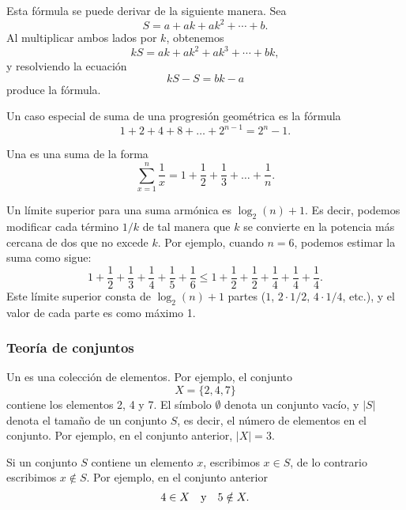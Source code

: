 Esta fórmula se puede derivar de la siguiente manera. Sea
\[ S = a + ak + ak^2 + \cdots + b .\]
Al multiplicar ambos lados por $k$, obtenemos
\[ kS = ak + ak^2 + ak^3 + \cdots + bk,\]
y resolviendo la ecuación
\[ kS-S = bk-a\]
produce la fórmula.

Un caso especial de suma de una progresión geométrica es la fórmula
\[1+2+4+8+\ldots+2^{n-1}=2^n-1.\]


Una  es una suma de la forma
\[ \sum_{x=1}^n \frac{1}{x} = 1+\frac{1}{2}+\frac{1}{3}+\ldots+\frac{1}{n}.\]

Un límite superior para una suma armónica es $\log_2(n)+1$.
Es decir, podemos
modificar cada término $1/k$ de tal manera que $k$ se convierte en
la potencia más cercana de dos que no excede $k$.
Por ejemplo, cuando $n=6$, podemos estimar
la suma como sigue:
\[ 1+\frac{1}{2}+\frac{1}{3}+\frac{1}{4}+\frac{1}{5}+\frac{1}{6} \le
1+\frac{1}{2}+\frac{1}{2}+\frac{1}{4}+\frac{1}{4}+\frac{1}{4}.\]
Este límite superior consta de $\log_2(n)+1$ partes
($1$, $2 \cdot 1/2$, $4 \cdot 1/4$, etc.),
y el valor de cada parte es como máximo 1.

\subsubsection{Teoría de conjuntos}


Un  es una colección de elementos.
Por ejemplo, el conjunto
\[X=\{2,4,7\}\]
contiene los elementos 2, 4 y 7.
El símbolo $\emptyset$ denota un conjunto vacío,
y $|S|$ denota el tamaño de un conjunto $S$,
es decir, el número de elementos en el conjunto.
Por ejemplo, en el conjunto anterior, $|X|=3$.

Si un conjunto $S$ contiene un elemento $x$,
escribimos $x \in S$,
de lo contrario escribimos $x \notin S$.
Por ejemplo, en el conjunto anterior
\[4 \in X \hspace{10px}\textrm{y}\hspace{10px} 5 \notin X.\]

